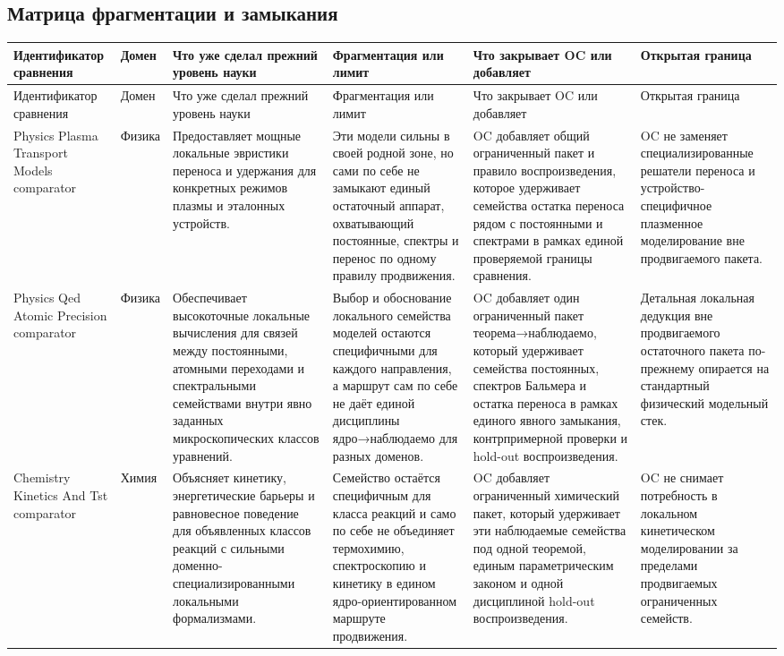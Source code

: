 \subsection{Матрица фрагментации и замыкания}
\begin{longtable}{@{}L{0.17\textwidth}L{0.09\textwidth}L{0.17\textwidth}L{0.17\textwidth}L{0.20\textwidth}L{0.14\textwidth}@{}}
\toprule
Идентификатор сравнения & Домен & Что уже сделал прежний уровень науки & Фрагментация или лимит & Что закрывает OC или добавляет & Открытая граница \\
\midrule
\endfirsthead
\toprule
Идентификатор сравнения & Домен & Что уже сделал прежний уровень науки & Фрагментация или лимит & Что закрывает OC или добавляет & Открытая граница \\
\midrule
\endhead
Physics Plasma Transport Models comparator & Физика & Предоставляет мощные локальные эвристики переноса и удержания для конкретных режимов плазмы и эталонных устройств. & Эти модели сильны в своей родной зоне, но сами по себе не замыкают единый остаточный аппарат, охватывающий постоянные, спектры и перенос по одному правилу продвижения. & OC добавляет общий ограниченный пакет и правило воспроизведения, которое удерживает семейства остатка переноса рядом с постоянными и спектрами в рамках единой проверяемой границы сравнения. & OC не заменяет специализированные решатели переноса и устройство-специфичное плазменное моделирование вне продвигаемого пакета. \\
Physics Qed Atomic Precision comparator & Физика & Обеспечивает высокоточные локальные вычисления для связей между постоянными, атомными переходами и спектральными семействами внутри явно заданных микроскопических классов уравнений. & Выбор и обоснование локального семейства моделей остаются специфичными для каждого направления, а маршрут сам по себе не даёт единой дисциплины ядро→наблюдаемо для разных доменов. & OC добавляет один ограниченный пакет теорема→наблюдаемо, который удерживает семейства постоянных, спектров Бальмера и остатка переноса в рамках единого явного замыкания, контрпримерной проверки и hold-out воспроизведения. & Детальная локальная дедукция вне продвигаемого остаточного пакета по-прежнему опирается на стандартный физический модельный стек. \\
Chemistry Kinetics And Tst comparator & Химия & Объясняет кинетику, энергетические барьеры и равновесное поведение для объявленных классов реакций с сильными доменно-специализированными локальными формализмами. & Семейство остаётся специфичным для класса реакций и само по себе не объединяет термохимию, спектроскопию и кинетику в едином ядро-ориентированном маршруте продвижения. & OC добавляет ограниченный химический пакет, который удерживает эти наблюдаемые семейства под одной теоремой, единым параметрическим законом и одной дисциплиной hold-out воспроизведения. & OC не снимает потребность в локальном кинетическом моделировании за пределами продвигаемых ограниченных семейств. \\

\end{longtable}
